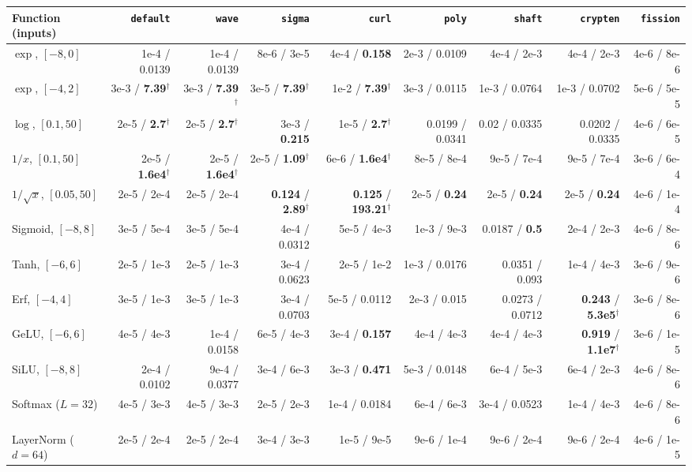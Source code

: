 \begin{tabular}{@{}lrrrrrrrr@{}}
\toprule
\textbf{Function (inputs)} & \texttt{default} & \texttt{wave} & \texttt{sigma} & \texttt{curl} & \texttt{poly} & \texttt{shaft} & \texttt{crypten} & \texttt{fission} \\
\midrule
$\exp$, $[-8, 0]$         & 1e-4 / 0.0139 & 1e-4 / 0.0139 & 8e-6 / 3e-5 & 4e-4 / \textbf{0.158} & 2e-3 / 0.0109 & 4e-4 / 2e-3 & 4e-4 / 2e-3 & 4e-6 / 8e-6 \\
$\exp$, $[-4, 2]$         & 3e-3 / \textbf{7.39}$^\dagger$ & 3e-3 / \textbf{7.39}$^\dagger$ & 3e-5 / \textbf{7.39}$^\dagger$ & 1e-2 / \textbf{7.39}$^\dagger$ & 3e-3 / 0.0115 & 1e-3 / 0.0764 & 1e-3 / 0.0702 & 5e-6 / 5e-5 \\
$\log$, $[0.1, 50]$       & 2e-5 / \textbf{2.7}$^\dagger$ & 2e-5 / \textbf{2.7}$^\dagger$ & 3e-3 / \textbf{0.215} & 1e-5 / \textbf{2.7}$^\dagger$ & 0.0199 / 0.0341 & 0.02 / 0.0335 & 0.0202 / 0.0335 & 4e-6 / 6e-5 \\
$1/x$, $[0.1, 50]$        & 2e-5 / \textbf{1.6e4}$^\dagger$ & 2e-5 / \textbf{1.6e4}$^\dagger$ & 2e-5 / \textbf{1.09}$^\dagger$ & 6e-6 / \textbf{1.6e4}$^\dagger$ & 8e-5 / 8e-4 & 9e-5 / 7e-4 & 9e-5 / 7e-4 & 3e-6 / 6e-4 \\
$1/\sqrt{x}$, $[0.05, 50]$& 2e-5 / 2e-4 & 2e-5 / 2e-4 & \textbf{0.124} / \textbf{2.89}$^\dagger$ & \textbf{0.125} / \textbf{193.21}$^\dagger$ & 2e-5 / \textbf{0.24} & 2e-5 / \textbf{0.24} & 2e-5 / \textbf{0.24} & 4e-6 / 1e-4 \\
Sigmoid, $[-8, 8]$        & 3e-5 / 5e-4 & 3e-5 / 5e-4 & 4e-4 / 0.0312 & 5e-5 / 4e-3 & 1e-3 / 9e-3 & 0.0187 / \textbf{0.5} & 2e-4 / 2e-3 & 4e-6 / 8e-6 \\
Tanh, $[-6, 6]$           & 2e-5 / 1e-3 & 2e-5 / 1e-3 & 3e-4 / 0.0623 & 2e-5 / 1e-2 & 1e-3 / 0.0176 & 0.0351 / 0.093 & 1e-4 / 4e-3 & 3e-6 / 9e-6 \\
Erf, $[-4, 4]$            & 3e-5 / 1e-3 & 3e-5 / 1e-3 & 3e-4 / 0.0703 & 5e-5 / 0.0112 & 2e-3 / 0.015 & 0.0273 / 0.0712 & \textbf{0.243} / \textbf{5.3e5}$^\dagger$ & 3e-6 / 8e-6 \\
GeLU, $[-6, 6]$           & 4e-5 / 4e-3 & 1e-4 / 0.0158 & 6e-5 / 4e-3 & 3e-4 / \textbf{0.157} & 4e-4 / 4e-3 & 4e-4 / 4e-3 & \textbf{0.919} / \textbf{1.1e7}$^\dagger$ & 3e-6 / 1e-5 \\
SiLU, $[-8, 8]$           & 2e-4 / 0.0102 & 9e-4 / 0.0377 & 3e-4 / 6e-3 & 3e-3 / \textbf{0.471} & 5e-3 / 0.0148 & 6e-4 / 5e-3 & 6e-4 / 2e-3 & 4e-6 / 8e-6 \\
Softmax ($L=32$)          & 4e-5 / 3e-3 & 4e-5 / 3e-3 & 2e-5 / 2e-3 & 1e-4 / 0.0184 & 6e-4 / 6e-3 & 3e-4 / 0.0523 & 1e-4 / 4e-3 & 4e-6 / 8e-6 \\
LayerNorm ($d=64$)        & 2e-5 / 2e-4 & 2e-5 / 2e-4 & 3e-4 / 3e-3 & 1e-5 / 9e-5 & 9e-6 / 1e-4 & 9e-6 / 2e-4 & 9e-6 / 2e-4 & 4e-6 / 1e-5 \\
\bottomrule
\end{tabular}

